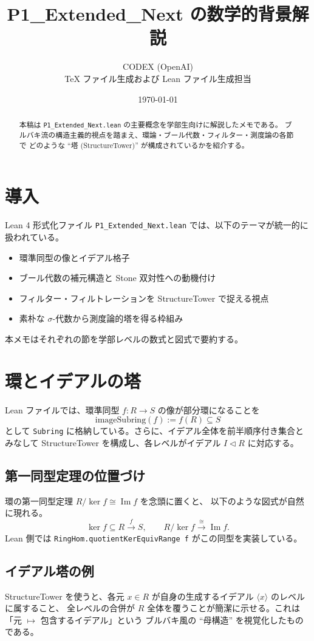 \documentclass[a4paper]{ltjsarticle}
\title{P1\_Extended\_Next の数学的背景解説}
\author{CODEX (OpenAI)\\TeX ファイル生成および Lean ファイル生成担当}
\date{\today}
\begin{document}
\maketitle

\begin{abstract}
本稿は \texttt{P1\_Extended\_Next.lean} の主要概念を学部生向けに解説したメモである。
ブルバキ流の構造主義的視点を踏まえ、環論・ブール代数・フィルター・測度論の各節で
どのような ``塔 (StructureTower)'' が構成されているかを紹介する。
\end{abstract}

\section{導入}

Lean 4 形式化ファイル \texttt{P1\_Extended\_Next.lean} では、以下のテーマが統一的に扱われている。
\begin{itemize}
  \item 環準同型の像とイデアル格子
  \item ブール代数の補元構造と Stone 双対性への動機付け
  \item フィルター・フィルトレーションを StructureTower で捉える視点
  \item 素朴な $\sigma$-代数から測度論的塔を得る枠組み
\end{itemize}
本メモはそれぞれの節を学部レベルの数式と図式で要約する。

\section{環とイデアルの塔}

Lean ファイルでは、環準同型 $f:R \to S$ の像が部分環になることを
\[
  \mathrm{imageSubring}(f) := f(R) \subseteq S
\]
として \texttt{Subring} に格納している。さらに、イデアル全体を前半順序付き集合とみなして
StructureTower を構成し、各レベルがイデアル $I \lhd R$ に対応する。

\subsection*{第一同型定理の位置づけ}
環の第一同型定理 $R/\ker f \cong \operatorname{Im} f$ を念頭に置くと、
以下のような図式が自然に現れる。
\[
  \ker f \subseteq R \xrightarrow{f} S,\qquad R/\ker f \xrightarrow{\cong} \operatorname{Im} f.
\]
Lean 側では \texttt{RingHom.quotientKerEquivRange f} がこの同型を実装している。

\subsection*{イデアル塔の例}
StructureTower を使うと、各元 $x\in R$ が自身の生成するイデアル $\langle x\rangle$ のレベルに属すること、
全レベルの合併が $R$ 全体を覆うことが簡潔に示せる。これは「元 $\mapsto$ 包含するイデアル」という
ブルバキ風の ``母構造'' を視覚化したものである。
\end{document}
